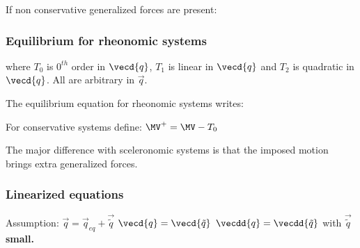 \documentclass[10pt,a4paper]{scrartcl}
\begin{document}
\begin{multicols*}{2}
If non conservative generalized forces are present:


\subsubsection{Equilibrium for rheonomic systems}


where $T_0$ is $0^{th}$ order in $\vecd{q}$, $T_1$ is linear in $\vecd{q}$ and $T_2$ is quadratic in $\vecd{q}$. All are arbitrary in $\vec{q}$.



The equilibrium equation for rheonomic systems writes:


For conservative systems define: $\MV^+=\MV - T_0$


The major difference with sceleronomic systems is that the imposed motion brings extra generalized forces.

\subsubsection{Linearized equations}

Assumption: $\vec{q}=\vec{q}_{eq}+\vec{\tilde{q}}$ $\vecd {q}=\vecd{\tilde{q}}$ $\vecdd{q}=\vecdd{\tilde{q}}$ with $\vec{\tilde{q}}$ \textbf{small.}



\end{multicols*}
\end{document}
